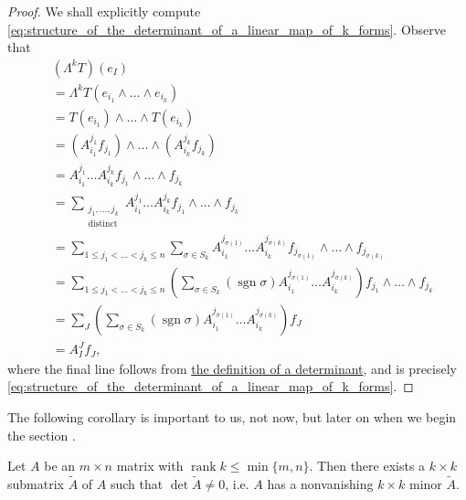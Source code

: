 \documentclass[notoc,notitlepage]{tufte-book}
\DeclareMathOperator{\rank}{rank}
\DeclareMathOperator{\sgn}{sgn}
\begin{document}
\begin{proof}
  We shall explicitly compute
  \cref{eq:structure_of_the_determinant_of_a_linear_map_of_k_forms}. Observe
  that
  \begin{align*}
    &(\Lambda^k T)(e_I) \\
    &= \Lambda^k T (e_{i_1} \land \hdots \land e_{i_k}) \\
    &= T(e_{i_1}) \land \hdots \land T(e_{i_k}) \\
    &= (A^{j_1}_{i_1} f_{j_1}) \land \hdots \land (A^{j_k}_{i_k} f_{j_k}) \\
    &= A^{j_1}_{i_1} \hdots A^{j_k}_{i_k} f_{j_1} \land \hdots \land f_{j_k} \\
    &= \sum_{\substack{j_1, \ldots, j_k \\ \text{distinct}}} A^{j_1}_{i_1}
      \hdots A^{j_k}_{i_k} f_{j_1} \land \hdots \land f_{j_k} \\
    &= \sum_{1 \leq j_1 < \hdots < j_k \leq n} \sum_{\sigma \in S_k}
      A^{j_{\sigma(1)}}_{i_1} \hdots A^{j_{\sigma(k)}}_{i_k} f_{j_{\sigma(1)}}
      \land \hdots \land f_{j_{\sigma(k)}} \\
    &= \sum_{1 \leq j_1 < \hdots < j_k \leq n} \left( \sum_{\sigma \in S_k}
      (\sgn \sigma) A^{j_{\sigma(1)}}_{i_1} \hdots A^{j_{\sigma(k)}}_{i_k}
      \right) f_{j_1} \land \hdots \land f_{j_k} \\
    &= \sum_{J} \left( \sum_{\sigma \in S_k} (\sgn \sigma)
      A^{j_{\sigma(1)}}_{i_1} \hdots A^{j_{\sigma(k)}}_{i_k} \right) f_J \\
    &= A^J_I f_J,
  \end{align*}
  where the final line follows from \hyperref[defn:determinant]{the definition
  of a determinant}, and is precisely
  \cref{eq:structure_of_the_determinant_of_a_linear_map_of_k_forms}.
\end{proof}

The following corollary is important to us, not now, but later on when we begin
the section .

\begin{crly}\label{crly:nonvanishing_minor}
  Let $A$ be an $m \times n$ matrix with $\rank k \leq \min \{ m, n \}$. Then
  there exists a $k \times k$ submatrix $\tilde{A}$ of $A$ such that $\det
  \tilde{A} \neq 0$, i.e. $A$ has a nonvanishing $k \times k$ minor $\tilde{A}$.
\end{crly}
\end{document}

